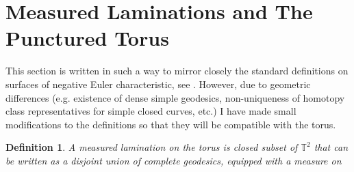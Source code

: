 \documentclass{article}
\newtheorem{defn}{Definition}
\begin{document}
        \section{Measured Laminations and The Punctured Torus}
        This section is written in such a way to mirror closely the standard definitions on surfaces of negative Euler characteristic, see \cite{Martelli_2025}. However, due to geometric differences (e.g. existence of dense simple geodesics, non-uniqueness of homotopy class representatives for simple closed curves, etc.) I have made small modifications to the definitions so that they will be compatible with the torus.
        \begin{defn}
            A measured lamination on the torus is closed subset of \(\mathbb{T}^2\) that can be written as a disjoint union of complete geodesics, equipped with a measure on 
        \end{defn}
\end{document}
